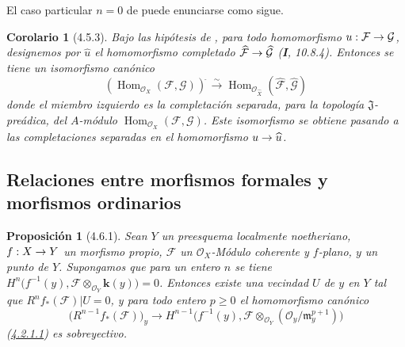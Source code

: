 \documentclass[10pt,oneside,openany]{book}
\theoremstyle{egaenv}\newtheorem*{env}{---}
\theoremstyle{egastatement}
\newtheorem*{proposition}{Proposición}
\newtheorem*{corollary}{Corolario}
\theoremstyle{egadescription}
\newcommand{\oldpage}[2][]{\marginnote{\normalfont\scriptsize\textbf{#1}\,|\,#2}\ignorespaces}
\renewcommand{\geq}{\geqslant}
\renewcommand{\to}{\mathchoice{\longrightarrow}{\rightarrow}{\rightarrow}{\rightarrow}}
\begin{document}
El caso particular $n=0$ de  puede enunciarse como
sigue.

\begin{corollary}[4.5.3]
\label{III.4.5.3}
\label{III.4.5.3-fr}
Bajo las hipótesis de , para todo homomorfismo
$u:\mathcal F\to\mathcal G$, designemos por
$\widehat u$ el homomorfismo
completado $\widehat{\mathcal F}\to\widehat{\mathcal G}$ \textup{(\textbf{I}, 10.8.4)}. Entonces se tiene un isomorfismo canónico
\[
\label{III.4.5.3.1-fr}
\left(\operatorname{Hom}_{\mathcal O_X}(\mathcal F,\mathcal G)\right)^{\widehat{\,}}
\xrightarrow{\sim}
\operatorname{Hom}_{\mathcal O_{\widehat X}}
(\widehat{\mathcal F},\widehat{\mathcal G})
\tag{4.5.3.1}
\]
donde el miembro izquierdo es la completación separada, para la
topología $\mathfrak J$-preádica, del $A$-módulo
$\operatorname{Hom}_{\mathcal O_X}(\mathcal F,\mathcal G)$. Este isomorfismo se obtiene pasando
a las completaciones separadas en el homomorfismo
$u\to\widehat u$.
\end{corollary}


\subsection{Relaciones entre morfismos formales y morfismos ordinarios}
\label{subsection:III.4.6}

\begin{proposition}[4.6.1]
\label{III.4.6.1-fr}
Sean $Y$ un preesquema localmente noetheriano, $f:X\to Y$ un morfismo
propio, $\mathcal F$ un $\mathcal O_X$-Módulo coherente y $f$-plano, $y$ un
punto de $Y$. Supongamos que para un
\oldpage[III]{140}
entero $n$ se tiene
$H^n\bigl(f^{-1}(y),\mathcal F\otimes_{\mathcal O_Y}\boldsymbol{k}(y)\bigr)=0$.
Entonces existe una vecindad $U$ de $y$ en $Y$ tal que
$R^nf_*(\mathcal F)|U=0$, y para todo entero $p\geq0$ el homomorfismo
canónico
\[
\bigl(R^{n-1}f_*(\mathcal F)\bigr)_y
\longrightarrow
H^{n-1}\bigl(f^{-1}(y),
\mathcal F\otimes_{\mathcal O_Y}
(\mathcal O_y/\mathfrak m_y^{p+1})\bigr)
\]
\textup{(\hyperref[III.4.2.1.1-fr]{4.2.1.1})} es sobreyectivo.
\end{proposition}
\end{document}
